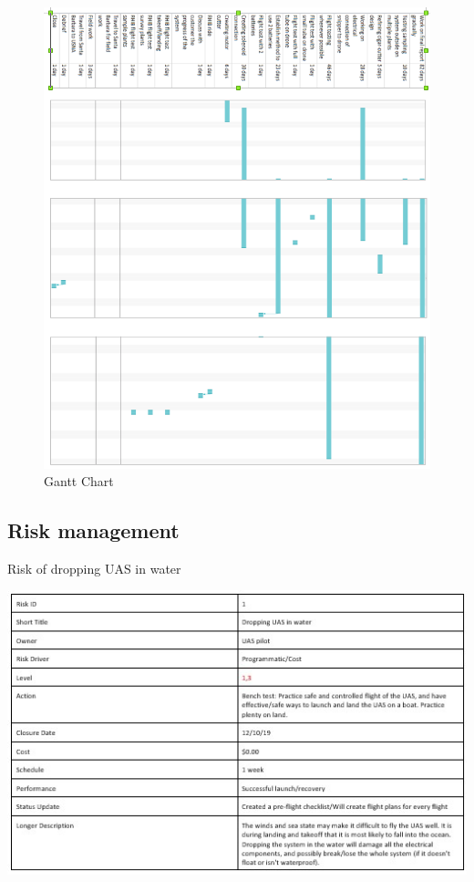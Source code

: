 \documentclass{wrcecapstone}
\begin{document}
\clearpage
\begin{figure}
\begin{center}
\includegraphics[width=\columnwidth]{figures/gantt.png}
\end{center}
\caption{Gantt Chart}
\label{tab:8.2.3}
\end{figure}





\subsection{Risk management}
\begin{table}
\caption{Risk of dropping UAS in water}
\label{tab:8.3.1a}
\includegraphics[width=\columnwidth]{figures/table-831a.jpg}
\end{table}
\end{document}
